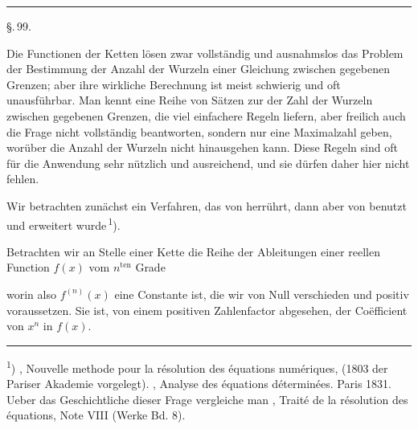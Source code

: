 
\begin{center}


\rule{0.3\linewidth}{0.4pt}

\S.\,99.

\end{center}

Die Functionen der  Ketten lösen zwar vollständig und ausnahmslos das Problem der Bestimmung der Anzahl der Wurzeln einer Gleichung zwischen gegebenen Grenzen; aber ihre wirkliche Berechnung ist meist schwierig und oft unausführbar. Man kennt eine Reihe von Sätzen zur  der Zahl der Wurzeln zwischen gegebenen Grenzen, die viel einfachere Regeln liefern, aber freilich auch die Frage nicht vollständig beantworten, sondern nur eine Maximalzahl geben, worüber die Anzahl der Wurzeln nicht hinausgehen kann. Diese Regeln sind oft für die Anwendung sehr nützlich und ausreichend, und sie dürfen daher hier nicht fehlen.

Wir betrachten zunächst ein Verfahren, das von  herrührt, dann aber von  benutzt und erweitert wurde\,\textsuperscript{1}).

Betrachten wir an Stelle einer  Kette die Reihe der Ableitungen einer reellen Function $f(x)$ vom $n^{\mathrm{ten}}$ Grade


worin also $f^{(n)}(x)$ eine Constante ist, die wir von Null verschieden und positiv voraussetzen. Sie ist, von einem positiven Zahlenfactor abgesehen, der Co\"efficient von $x^n$ in $f(x)$.

\noindent\rule{0.25\linewidth}{0.4pt}

\footnotesize
\textsuperscript{1}) , Nouvelle methode pour la r\'esolution des \'equations num\'eriques, (1803 der Pariser Akademie vorgelegt). , Analyse des \'equations d\'etermin\'ees. Paris 1831. Ueber das Geschichtliche dieser Frage vergleiche man , Trait\'e de la r\'esolution des \'equations, Note VIII (Werke Bd. 8).
\normalsize
